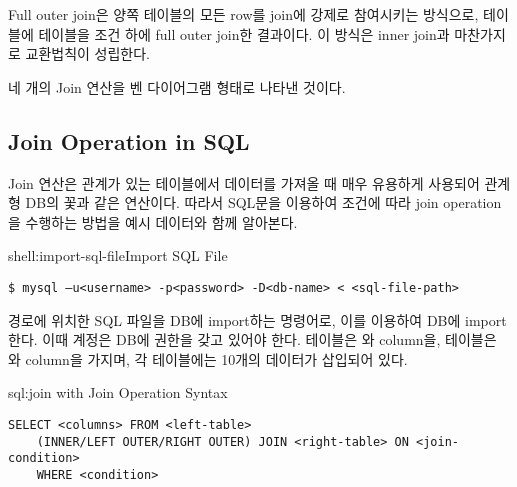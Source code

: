 Full outer join은 양쪽 테이블의 모든 row를 join에 강제로 참여시키는 방식으로, \은  테이블에  테이블을  조건 하에 full outer join한 결과이다. 이 방식은 inner join과 마찬가지로 교환법칙이 성립한다.


\은 네 개의 Join 연산을 벤 다이어그램 형태로 나타낸 것이다.

\subsection*{Join Operation in SQL}

Join 연산은 관계가 있는 테이블에서 데이터를 가져올 때 매우 유용하게 사용되어 관계형 DB의 꽃과 같은 연산이다. 따라서 SQL문을 이용하여 조건에 따라 join operation을 수행하는 방법을 예시 데이터와 함께 알아본다.

\begin{shellenv}{shell:import-sql-file}{Import SQL File}\begin{verbatim}
$ mysql –u<username> -p<password> -D<db-name> < <sql-file-path>
\end{verbatim}
\end{shellenv}

\은  경로에 위치한 SQL 파일을  DB에 import하는 명령어로, 이를 이용하여 \을 DB에 import한다. 이때  계정은  DB에 권한을 갖고 있어야 한다.  테이블은 와  column을,  테이블은 와  column을 가지며, 각 테이블에는 10개의 데이터가 삽입되어 있다.

\begin{sqlenv}{sql:join}{ with Join Operation Syntax}\begin{verbatim}
SELECT <columns> FROM <left-table>
    (INNER/LEFT OUTER/RIGHT OUTER) JOIN <right-table> ON <join-condition>
    WHERE <condition>
\end{verbatim}
\end{sqlenv}

